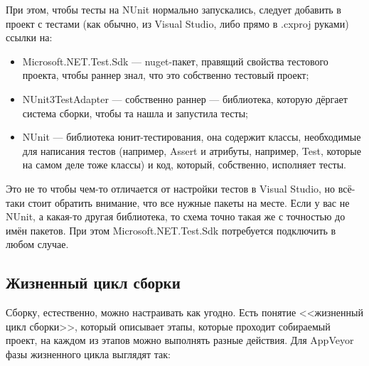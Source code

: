\documentclass[a5paper]{article}
\begin{document}
При этом, чтобы тесты на NUnit нормально запускались, следует добавить в проект с тестами (как обычно, из Visual Studio, либо прямо в .cxproj руками) ссылки на:
\begin{itemize}
    \item Microsoft.NET.Test.Sdk --- nuget-пакет, правящий свойства тестового проекта, чтобы раннер знал, что это собственно тестовый проект;
    \item NUnit3TestAdapter --- собственно раннер --- библиотека, которую дёргает система сборки, чтобы та нашла и запустила тесты;
    \item NUnit --- библиотека юнит-тестирования, она содержит классы, необходимые для написания тестов (например, Assert и атрибуты, например, Test, которые на самом деле тоже классы) и код, который, собственно, исполняет тесты.
\end{itemize}

Это не то чтобы чем-то отличается от настройки тестов в Visual Studio, но всё-таки стоит обратить внимание, что все нужные пакеты на месте. Если у вас не NUnit, а какая-то другая библиотека, то схема точно такая же с точностью до имён пакетов. При этом Microsoft.NET.Test.Sdk потребуется подключить в любом случае.

\subsection{Жизненный цикл сборки}

Сборку, естественно, можно настраивать как угодно. Есть понятие <<жизненный цикл сборки>>, который описывает этапы, которые проходит собираемый проект, на каждом из этапов можно выполнять разные действия. Для AppVeyor фазы жизненного цикла выглядят так:
\end{document}
